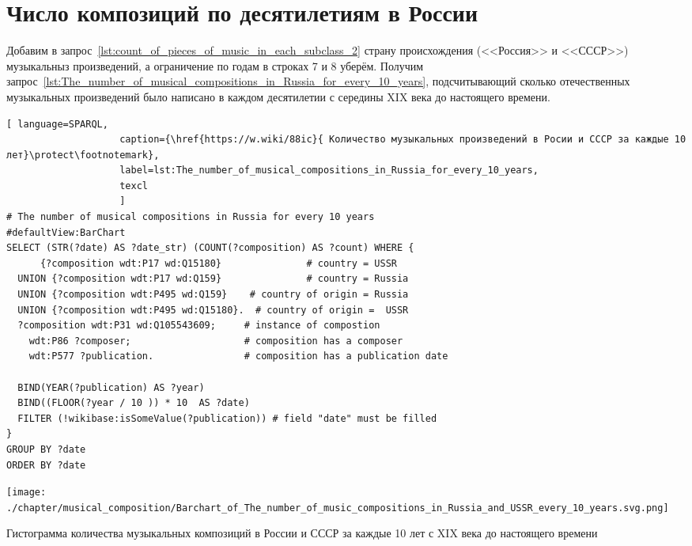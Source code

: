 \section{Число композиций по десятилетиям в России}
Добавим в запрос~\ref{lst:count_of_pieces_of_music_in_each_subclass_2} страну происхождения (<<Россия>> и <<СССР>>) музыкальныз произведений, а ограничение по годам в строках 7 и 8 уберём. Получим запрос~\ref{lst:The_number_of_musical_compositions_in_Russia_for_every_10_years}, подсчитывающий сколько отечественных музыкальных произведений было написано в каждом десятилетии с середины XIX века до настоящего времени.

\begin{lstlisting}[ language=SPARQL,
                    caption={\href{https://w.wiki/88ic}{ Количество музыкальных произведений в Росии и СССР за каждые 10 лет}\protect\footnotemark},
                    label=lst:The_number_of_musical_compositions_in_Russia_for_every_10_years,
                    texcl 
                    ]
# The number of musical compositions in Russia for every 10 years
#defaultView:BarChart
SELECT (STR(?date) AS ?date_str) (COUNT(?composition) AS ?count) WHERE {
      {?composition wdt:P17 wd:Q15180}               # country = USSR
  UNION {?composition wdt:P17 wd:Q159}               # country = Russia
  UNION {?composition wdt:P495 wd:Q159}    # country of origin = Russia
  UNION {?composition wdt:P495 wd:Q15180}.  # country of origin =  USSR
  ?composition wdt:P31 wd:Q105543609;     # instance of compostion
    wdt:P86 ?composer;                    # composition has a composer
    wdt:P577 ?publication.                # composition has a publication date

  BIND(YEAR(?publication) AS ?year)
  BIND((FLOOR(?year / 10 )) * 10  AS ?date)
  FILTER (!wikibase:isSomeValue(?publication)) # field "date" must be filled
}
GROUP BY ?date
ORDER BY ?date
\end{lstlisting}%

\begin{marginfigure}[0\baselineskip]
	\texttt{[image: ./chapter/musical\_composition/Barchart\_of\_The\_number\_of\_music\_compositions\_in\_Russia\_and\_USSR\_every\_10\_years.svg.png]}
	\caption[Гистограмма количества музыкальных композиций в России и СССР за каждые 10 лет с XIX века до настоящего времени]{Гистограмма количества музыкальных композиций в России и СССР за каждые 10 лет с XIX века до настоящего времени}%
\end{marginfigure}

